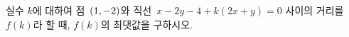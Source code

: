 실수 $k$에 대하여 점~$(1{,}\mkern3mu\mathopen{}-2)$와 직선~$x-2y-4+k(2x+y)=0$ 사이의 거리를 $f(k)$라 할 때, $f(k)$의 최댓값을 구하시오.
